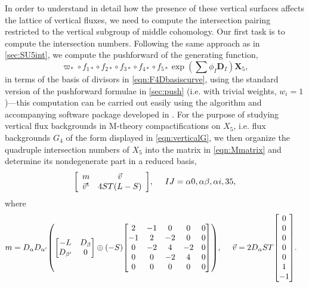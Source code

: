 \documentclass[11pt,oneside,english]{article}
\numberwithin{equation}{section}
\let\originalleft\left
\let\originalright\right
\renewcommand*{\left}{\mathopen{}\mathclose\bgroup\originalleft}
\renewcommand*{\right}{\aftergroup\egroup\originalright}
\theoremstyle{definition}
\begin{document}
In order to understand in detail how the presence of these vertical surfaces affects the lattice of vertical fluxes, we need to compute the intersection pairing restricted to the vertical subgroup of middle cohomology. Our first task is to compute the intersection numbers. Following the same approach as in \cref{sec:SU5int}, we compute the pushforward of the generating function, 
$$\varpi_* \circ f_{1*} \circ f_{2*} \circ f_{3*} \circ f_{4*} \circ f_{5*}\exp(\sum \phi_I \boldsymbol D_I) \boldsymbol X_5,$$
 in terms of the basis of divisors in \cref{eqn:F4Dbasiscurve}, using the standard version of the pushforward formulae in \cref{sec:push} (i.e. with trivial weights, $w_i =1$)---this computation can be carried out easily using the algorithm and accompanying software package developed in \cite{Jefferson:2022xft}. For the purpose of studying vertical flux backgrounds in M-theory compactifications on $X_5$, i.e. flux backgrounds $G_4$ of the form displayed in \cref{eqn:verticalG}, we then organize the quadruple intersection numbers of $X_5$ into the matrix in \cref{eqn:Mmatrix} and determine its nondegenerate part in a reduced basis,
	\begin{align}
	\label{eqn:F4m}
		\left[ \begin{array}{cc} m &\vec v\\
		\vec v^{\mathrm t} & 4 S T (L-S)
		\end{array}\right],~~~~IJ = \alpha 0, \alpha \beta, \alpha i , 35,
	\end{align}
where
	\begin{align}
	\begin{split}
	\label{eqn:F4M}
		m &=  D_\alpha D_{\alpha'}\left(  \begin{bmatrix} - L & D_\beta \\
		 D_{\beta'} &0 \end{bmatrix} \oplus (-S)\begin{bmatrix} 2 & -1 & 0& 0&0 \\ -1 & 2 & -2 &0&0 \\0 & -2 &4 &-2 &0\\ 0 &0& -2 &4&0\\0&0&0&0&0\end{bmatrix}  \right),~~~~
		 \vec v = 2 D_\alpha S T \begin{bmatrix}0 \\0\\ 0\\0\\ 0 \\ 1 \\ -1\end{bmatrix}.
	\end{split}
	\end{align}
\end{document}
